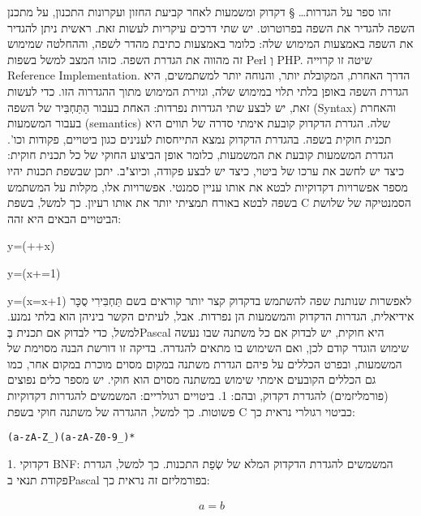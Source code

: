       זהו ספר על הגדרות…
      § דקדוק ומשמעות
      לאחר קביעת החזון ועקרונות התכנון, על מתכנן השפה להגדיר את השפה בפרוטרוט. יש שתי דרכים עיקריות לעשות זאת. ראשית ניתן להגדיר את השפה באמצעות המימוש שלה: כלומר באמצעות כתיבת מהדר לשפה, וההחלטה שמימוש זה מהווה את הגדרת השפה. כזהו המצב למשל בשפות Perl וְ PHP. שיטה זו קרוייה Reference Implementation.
      הדרך האחרת, המקובלת יותר, והנוחה יותר למשתמשים, היא הגדרת השפה באופן בלתי תלוי במימוש שלה, וגזירת המימוש מתוך ההגדרוה הזו. כדי לעשות זאת, יש לבצע שתי הגדרות נפרדות: האחת בעבור הַתַּחְבִּיר של השפה (Syntax) והאחרת בעבור המשמעות (semantics) שלה.
      הגדרת הדקדוק קובעת אימתי סדרה של תווים היא תכנית חוקית בשפה. בהגדרת הדקדוק נמצא התייחסות לענינים כגון ביטויים, פקודות וכו'. הגדרת המשמעות קובעת את המשמעות, כלומר אופן הביצוע החוקי של כל תכנית חוקית: כיצד יש לחשב את ערכו של ביטוי, כיצד יש לבצע פקודה, וכיוצ"ב.
      יתכן שבשפת תכנות יהיו מספר אפשרויות דקדוקיות לבטא את אותו עניין סמנטי. אפשרויות אלו, מקלות על המשתמש בשפה לבטא באורח תמציתי יותר את אותו רעיון. כך למשל, בשפת C הסמנטיקה של שלושת הביטויים הבאים היא זהה:
      \begin{ציינון}
\item y=(++x)
\item y=(x+=1)
\item y=(x=x+1)
      לאפשרות שנותנת שפה להשתמש בדקדוק קצר יותר קוראים בשם תַּחְבִּירִי סֻכָּר
      אידיאלית, הגדרות הדקדוק והמשמעות הן נפרדות. אבל, לעיתים הקשר ביניהן הוא בלתי נמנע. למשל, כדי לבדוק אם תכנית בְּPascal היא חוקית, יש לבדוק אם כל משתנה שבו נעשה שימוש הוגדר קודם לכן, ואם השימוש בו מתאים להגדרה. בדיקה זו דורשת הבנה מסוימת של המשמעות, ובפרט הכללים על פיהם הגדרת משתנה במקום מסוים מוכרת במקום אחר, כמו גם הכללים הקובעים אימתי שימוש במשתנה מסוים הוא חוקי.
      יש מספר כלים נפוצים (פורמליזמים) להגדרת דקדוק, ובהם:
      1. ביטויים רגולריים: המשמשים להגדרות דקדוקיות פשוטות. כך למשל, ההגדרה של משתנה חוקי בשפת C כביטוי רגולרי נראית כך:
  \end{ציינון}

\begin{verbatim}
(a-zA-Z_)(a-zA-Z0-9_)*
\end{verbatim}
      1. דקדוקי BNF: המשמשים להגדרת הדקדוק המלא של שְׂפַת התכנות. כך למשל, הגדרת פקודת תנאי בPascal בפורמליזם זה נראית כך:

      \begin{align}
        a=b
      \end{align}


